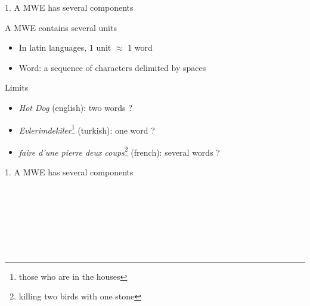 \documentclass[serif, aspectratio=169]{beamer}
\begin{document}
\begin{frame}{1. A MWE has several components}
    \begin{block}{A MWE contains several units}
        \begin{itemize}
            \item In latin languages, 1 unit $\approx$ 1 word
            \item Word: a sequence of characters delimited by spaces
        \end{itemize}
    \end{block}
    \vfill
    \pause
    \begin{block}{Limits}
        \begin{itemize}
            \item \textit{Hot Dog} (english): two words ?
            \item \textit{Evlerimdekiler}\footnote{those who are in the houses} (turkish): one word ?
            \item \textit{faire d'une pierre deux coups}\footnote{killing two birds with one stone} (french): several words ?
        \end{itemize}
    \end{block}
\end{frame}

\begin{frame}{1. A MWE has several components}
    \begin{block}{}
            \\
          \\ 
            \\
    \end{block}
    \vfill
    \pause
    \begin{block}{}
                \\
            \\ 
    \end{block}
\end{frame}
\end{document}
